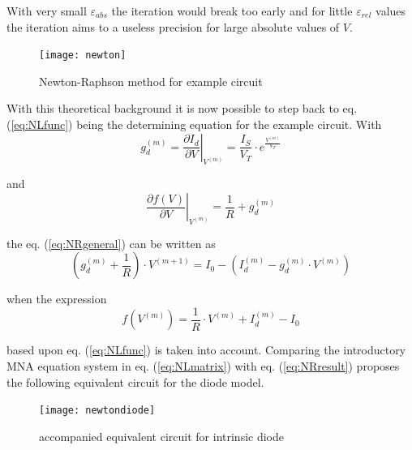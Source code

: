 \documentclass[10pt]{report}
\begin{document}
With very small $\varepsilon_{abs}$ the iteration would break too
early and for little $\varepsilon_{rel}$ values the iteration aims to
a useless precision for large absolute values of $V$.

\begin{figure}[ht]
\begin{center}
\texttt{[image: newton]}
\end{center}
\caption{Newton-Raphson method for example circuit}
\label{fig:NewtonRaphson}
\end{figure}
\FloatBarrier

With this theoretical background it is now possible to step back to
eq. (\ref{eq:NLfunc}) being the determining equation for the example
circuit.  With
\begin{equation}
g_{d}^{(m)} = \left.\dfrac{\partial I_{d}}{\partial V}\right|_{V^{(m)}} = \dfrac{I_{S}}{V_{T}}\cdot e^{\frac{V^{(m)}}{V_{T}}}
\end{equation}

and
\begin{equation}
\left.\dfrac{\partial f\left(V\right)}{\partial V}\right|_{V^{(m)}} = \dfrac{1}{R} + g_{d}^{(m)}
\end{equation}

the eq. (\ref{eq:NRgeneral}) can be written as
\begin{equation}
\left(g_{d}^{(m)} + \dfrac{1}{R}\right)\cdot V^{(m+1)} = I_{0} - \left(I_{d}^{(m)} - g_{d}^{(m)}\cdot V^{(m)}\right)
\label{eq:NRresult}
\end{equation}

when the expression
\begin{equation}
f\left(V^{(m)}\right) = \dfrac{1}{R}\cdot V^{(m)} + I_{d}^{(m)} - I_{0}
\end{equation}

based upon eq. (\ref{eq:NLfunc}) is taken into account.  Comparing the
introductory MNA equation system in eq. (\ref{eq:NLmatrix}) with
eq. (\ref{eq:NRresult}) proposes the following equivalent circuit for
the diode model.

\begin{figure}[ht]
\begin{center}
\texttt{[image: newtondiode]}
\end{center}
\caption{accompanied equivalent circuit for intrinsic diode}
\label{fig:AccompaniedModel}
\end{figure}
\FloatBarrier
\end{document}
